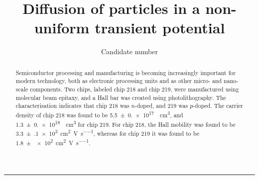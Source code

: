 \documentclass{labreport}
\title{Diffusion of particles in a non-uniform transient potential}
\author{Candidate number \candnum}
\begin{document}
\maketitle

\begin{abstract}
Semiconductor processing and manufacturing is becoming increasingly important for modern technology, both as electronic processing units and as other micro- and nano-scale components. Two  chips, labeled chip 218 and chip 219, were manufactured using molecular beam epitaxy, and a Hall bar was created using photolithography. The characterisation indicates that chip 218 was $n$-doped, and 219 was $p$-doped. The carrier density of chip 218 was found to be \SI{5.5(0.0)e17}{\per\centi\metre\cubed}, and \SI{1.3(0.0)e18}{\per\centi\metre\cubed} for chip 219.
For chip 218, the Hall mobility was found to be \SI{3.3(1)e3}{\centi\metre\squared\per\volt\per\second}, whereas for chip 219 it was found to be \SI{1.8(0)e2}{\centi\metre\squared\per\volt\per\second}.
\end{abstract}








\begin{center}
    \rule{2cm}{.4pt}
\end{center}
\makeatletter
{}
\makeatother
\nocite{*}
\printbibliography
\end{document}
